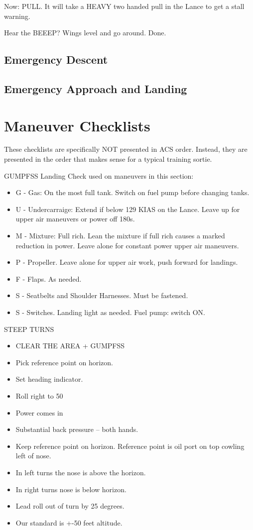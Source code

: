 Now: PULL. It will take a HEAVY two handed pull in the Lance to get a stall warning.

Hear the BEEEP? Wings level and go around. Done.

\subsection{Emergency Descent}

\subsection{Emergency Approach and Landing}

\section{Maneuver Checklists}

These checklists are specifically NOT presented in ACS order. Instead, they are presented in the order that makes sense for a typical training sortie.

GUMPFSS Landing Check used on maneuvers in this section:
\begin{itemize}
    \item G - Gas: On the most full tank. Switch on fuel pump before changing tanks.
    \item U - Undercarraige: Extend if below 129 KIAS on the Lance. Leave up for upper air maneuvers or power off 180s.
    \item M - Mixture: Full rich. Lean the mixture if full rich causes a marked reduction in power. Leave alone for constant power upper air maneuvers.
    \item P - Propeller. Leave alone for upper air work, push forward for landings.
    \item F - Flaps. As needed.
    \item S - Seatbelts and Shoulder Harnesses. Must be fastened.
    \item S - Switches. Landing light as needed. Fuel pump: switch ON.

\end{itemize}

STEEP TURNS
\begin{itemize}
    \item CLEAR THE AREA + GUMPFSS
    \item Pick reference point on horizon.
    \item Set heading indicator.
    \item Roll right to 50
    \item Power comes in
    \item Substantial back pressure – both hands.
    \item Keep reference point on horizon. Reference point is oil port on top cowling left of nose.
    \item In left turns the nose is above the horizon.
    \item In right turns nose is below horizon.
    \item Lead roll out of turn by 25 degrees.
    \item Our standard is +-50 feet altitude.
\end{itemize}


